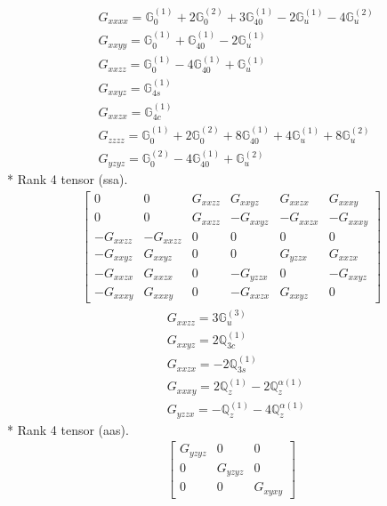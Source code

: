 \documentclass[fleqn,8pt,landscape]{jsarticle}
\begin{document}
\begin{align*}
& G_{xxxx} = \mathbb{G}_{0}^{(1)} + 2 \mathbb{G}_{0}^{(2)} + 3 \mathbb{G}_{40}^{(1)} - 2 \mathbb{G}_{u}^{(1)} - 4 \mathbb{G}_{u}^{(2)} \\
& G_{xxyy} = \mathbb{G}_{0}^{(1)} + \mathbb{G}_{40}^{(1)} - 2 \mathbb{G}_{u}^{(1)} \\
& G_{xxzz} = \mathbb{G}_{0}^{(1)} - 4 \mathbb{G}_{40}^{(1)} + \mathbb{G}_{u}^{(1)} \\
& G_{xxyz} = \mathbb{G}_{4s}^{(1)} \\
& G_{xxzx} = \mathbb{G}_{4c}^{(1)} \\
& G_{zzzz} = \mathbb{G}_{0}^{(1)} + 2 \mathbb{G}_{0}^{(2)} + 8 \mathbb{G}_{40}^{(1)} + 4 \mathbb{G}_{u}^{(1)} + 8 \mathbb{G}_{u}^{(2)} \\
& G_{yzyz} = \mathbb{G}_{0}^{(2)} - 4 \mathbb{G}_{40}^{(1)} + \mathbb{G}_{u}^{(2)}
\end{align*}
* Rank 4 tensor (ssa).
\begin{align*}
\begin{bmatrix} 0 & 0 & G_{xxzz} & G_{xxyz} & G_{xxzx} & G_{xxxy} \\ 0 & 0 & G_{xxzz} & - G_{xxyz} & - G_{xxzx} & - G_{xxxy} \\ - G_{xxzz} & - G_{xxzz} & 0 & 0 & 0 & 0 \\ - G_{xxyz} & G_{xxyz} & 0 & 0 & G_{yzzx} & G_{xxzx} \\ - G_{xxzx} & G_{xxzx} & 0 & - G_{yzzx} & 0 & - G_{xxyz} \\ - G_{xxxy} & G_{xxxy} & 0 & - G_{xxzx} & G_{xxyz} & 0 \end{bmatrix}
\end{align*}
\begin{align*}
& G_{xxzz} = 3 \mathbb{G}_{u}^{(3)} \\
& G_{xxyz} = 2 \mathbb{Q}_{3c}^{(1)} \\
& G_{xxzx} = - 2 \mathbb{Q}_{3s}^{(1)} \\
& G_{xxxy} = 2 \mathbb{Q}_{z}^{(1)} - 2 \mathbb{Q}_{z}^{\alpha(1)} \\
& G_{yzzx} = - \mathbb{Q}_{z}^{(1)} - 4 \mathbb{Q}_{z}^{\alpha(1)}
\end{align*}
* Rank 4 tensor (aas).
\begin{align*}
\begin{bmatrix} G_{yzyz} & 0 & 0 \\ 0 & G_{yzyz} & 0 \\ 0 & 0 & G_{xyxy} \end{bmatrix}
\end{align*}
\end{document}
